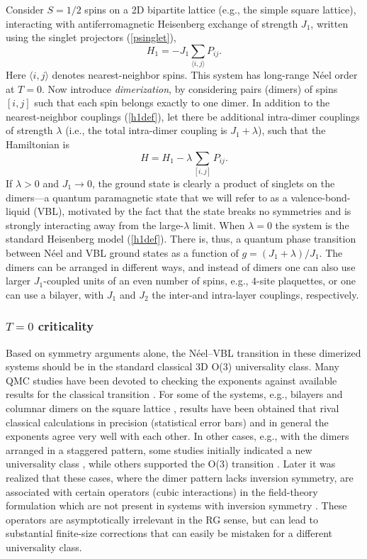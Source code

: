 \documentclass[range]{ar2e}
\begin{document}
Consider $S=1/2$ spins on a 2D bipartite lattice (e.g., the simple square lattice), interacting with antiferromagnetic Heisenberg exchange of 
strength $J_1$, written using the singlet projectors (\ref{psinglet}),
\begin{equation}
H_1 = -J_1 \sum_{\langle i,j\rangle} P_{ij}.
\label{h1def}
\end{equation}
Here $\langle i,j\rangle$ denotes nearest-neighbor spins. This system has long-range N\'eel order at $T=0$. Now introduce {\it dimerization}, 
by considering pairs (dimers) of spins $[i,j]$ such that each spin belongs exactly to one dimer. In addition to the nearest-neighbor couplings (\ref{h1def}),
let there be additional intra-dimer couplings of strength $\lambda$ (i.e., the total intra-dimer coupling is $J_1+\lambda$), such that the Hamiltonian is
\begin{equation}
H = H_1  -\lambda \sum_{[ i,j]} P_{ij} .
\end{equation}
If $\lambda>0$ and $J_1\to 0$, the ground state is clearly a product of singlets on the dimers---a quantum paramagnetic state that we will refer
to as a valence-bond-liquid (VBL), motivated by the fact that the state breaks no symmetries and is strongly interacting away from the large-$\lambda$
limit. When $\lambda=0$  the system is the standard Heisenberg model (\ref{h1def}). There is, thus, a quantum phase transition between N\'eel and VBL ground 
states as a function of $g=(J_1+\lambda)/J_1$. The dimers can be arranged in different ways, and instead of dimers one can also use larger $J_1$-coupled 
units of an even number of spins, e.g., $4$-site plaquettes, or one can use a bilayer, with $J_1$ and $J_2$ the inter-and intra-layer couplings, respectively.

\subsubsection{$T=0$ criticality}
Based on symmetry arguments alone, the N\'eel--VBL transition in these dimerized systems
should be in the standard classical 3D O($3$) universality class. Many QMC studies 
have been devoted to checking the exponents against available results for the classical transition \cite{Sandvik94,Troyer96,Matsumoto01,Wang06,Wenzel08,Wenzel09}.
For some of the systems, e.g., bilayers \cite{Wang06} and columnar dimers on the square lattice \cite{Matsumoto01,Wenzel09,Sandvik10b}, results have been 
obtained that rival classical calculations in precision (statistical error bars) and in general the exponents agree very well with each other. In other 
cases, e.g., with the dimers arranged in a staggered pattern, some studies initially indicated a new universality class \cite{Wenzel08}, while others
supported the O($3$) transition \cite{Jiang12}.  Later it was realized that these cases, where the dimer pattern lacks inversion symmetry, are associated 
with certain operators (cubic interactions) in the field-theory formulation  which are not present in systems with inversion symmetry \cite{Fritz11}. 
These operators are asymptotically irrelevant in the RG sense, but can lead to substantial finite-size corrections that can easily be mistaken for a 
different universality class.
\end{document}
